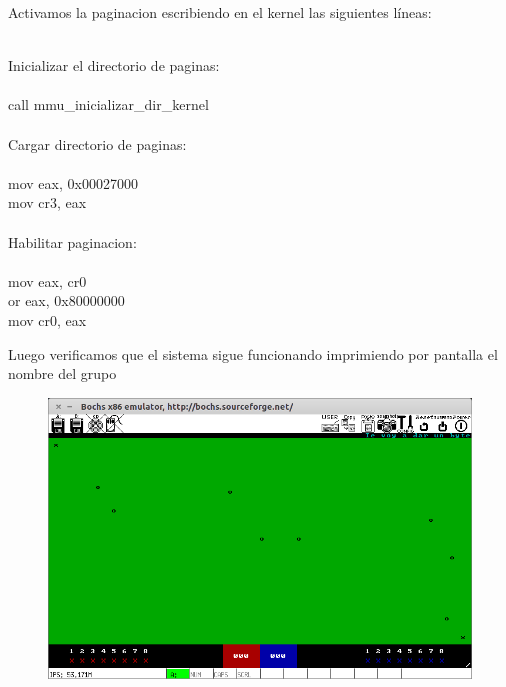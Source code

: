 	Activamos la paginacion escribiendo en el kernel las siguientes líneas:

	\begin{center}
    	$~$  \\ 	 
	Inicializar el directorio de paginas: \\
	$~$  \\ 	 
  	call mmu\_inicializar\_dir\_kernel  $~~~~~$  \\ 

  	$~$  \\ 
    	Cargar directorio de paginas:  $~~~~~~$  \\
    	$~$  \\ 

    	mov eax, 0x00027000  $~~~~~~~~~~~~~~~~~$  \\
    	mov cr3, eax  $~~~~~~~~~~~~~~~~~~~~~~~~~~~~$  \\

    	$~$  \\ 
    	Habilitar paginacion:  $~~~~~~~~~~~~~~~~$  \\
       	$~$  \\ 
   
        	mov eax, cr0  $~~~~~~~~~~~~~~~~~~~~~~~~~~~~$  \\
    	or eax, 0x80000000  $~~~~~~~~~~~~~~~~~~~$  \\
    	mov cr0, eax  $~~~~~~~~~~~~~~~~~~~~~~~~~~~~$  \\

	\end{center}

	Luego verificamos que el sistema sigue funcionando imprimiendo por pantalla el nombre del grupo

	  \begin{figure}[H]
	  \begin{center}
  	  \includegraphics[width=\linewidth]{ejercicio3/nombre.png}
  	  \caption{{\small }}
	  \endminipage
	  \end{center}
	  \end{figure}

